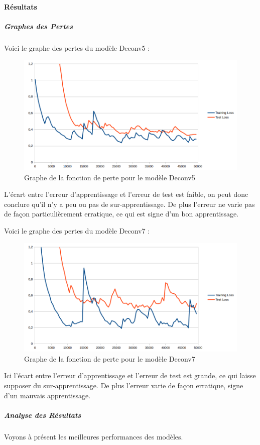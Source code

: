 \documentclass[a4paper, 11pt]{report}
\begin{document}
\paragraph{Résultats}
\subparagraph{Graphes des Pertes}
Voici le graphe des pertes du modèle Deconv5 :
\begin{figure}[H]
	\begin{center}
		\includegraphics[scale=0.6]{Images/Losses_Deconv5.png}
		\caption{Graphe de la fonction de perte pour le modèle Deconv5}
	\end{center}
\end{figure}
L'écart entre l'erreur d'apprentissage et l'erreur de test est faible, on peut donc conclure qu'il n'y a peu ou pas de sur-apprentissage.
De plus l'erreur ne varie pas de façon particulièrement erratique, ce qui est signe d'un bon apprentissage.

Voici le graphe des pertes du modèle Deconv7 :
\begin{figure}[H]
	\begin{center}
		\includegraphics[scale=0.6]{Images/Losses_Deconv7.png}
		\caption{Graphe de la fonction de perte pour le modèle Deconv7}
	\end{center}
\end{figure}
Ici l'écart entre l'erreur d'apprentissage et l'erreur de test est grande, ce qui laisse supposer du sur-apprentissage.
De plus l'erreur varie de façon erratique, signe d'un mauvais apprentissage.
\subparagraph{Analyse des Résultats}
Voyons à présent les meilleures performances des modèles.
\end{document}
